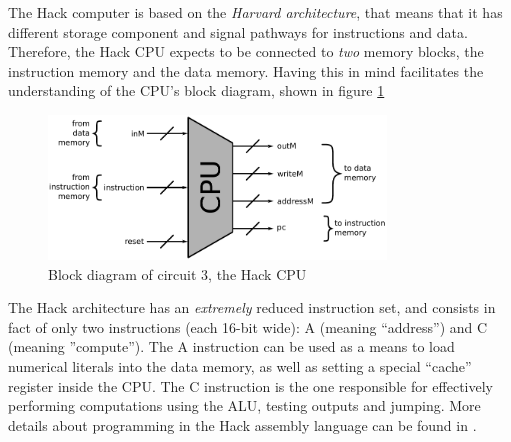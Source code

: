 \documentclass[a4paper]{article}
\begin{document}
            The Hack computer is based on the \emph{Harvard architecture}, that means that it has
            different storage component and signal pathways for instructions and data. Therefore,
            the Hack CPU expects to be connected to \emph{two} memory blocks, the instruction memory
            and the data memory. Having this in mind facilitates the understanding of the CPU's
            block diagram, shown in figure \ref{fig:cpu-block}
            \begin{figure}[h]
                \begin{center}
                    \includegraphics[width=0.8\textwidth]{imgs/cpu-block.pdf}
                \end{center}
                \label{fig:cpu-block}
                \caption{Block diagram of circuit 3, the Hack CPU}
            \end{figure}

            The Hack architecture has an \emph{extremely} reduced instruction set, and consists in
            fact of only two instructions (each 16-bit wide): A (meaning ``address'') and
            C (meaning ''compute''). The A instruction can be used as a means to load numerical
            literals into the data memory, as well as setting a special ``cache'' register inside
            the CPU. The C instruction is the one responsible for effectively performing
            computations using the ALU, testing outputs and jumping. More details about programming
            in the Hack assembly language can be found in \cite{nand2tetris-book}.
\end{document}

